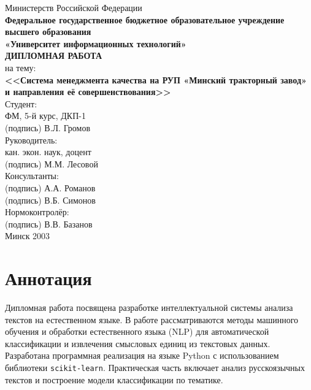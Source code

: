 \documentclass[14pt,a4paper]{extarticle}
\begin{document}
\begin{titlepage}
    \centering
    \large
    Министерств Российской Федерации\\
    \textbf{Федеральное государственное бюджетное образовательное учреждение высшего образования}\\
    \textbf{«Университет информационных технологий»}\\[2cm]

    \textbf{\Large ДИПЛОМНАЯ РАБОТА}\\[0.5cm]
    на тему:\\[0.3cm]
    \textbf{<<Система менеджмента качества на РУП «Минский тракторный завод» и направления её совершенствования>>}\\[4cm]

    Студент:\\
    ФМ, 5-й курс, ДКП-1\\
    (подпись) В.Л. Громов\\[1cm]

    Руководитель:\\
    кан. экон. наук, доцент\\
    (подпись) М.М. Лесовой\\[1cm]

    Консультанты:\\
    (подпись) А.А. Романов\\
    (подпись) В.Б. Симонов\\[1cm]

    Нормоконтролёр:\\
    (подпись) В.В. Базанов\\[3cm]

    Минск 2003
\end{titlepage}

\tableofcontents
\newpage

\section*{Аннотация}
Дипломная работа посвящена разработке интеллектуальной системы анализа текстов на естественном языке.
В работе рассматриваются методы машинного обучения и обработки естественного языка (NLP) для автоматической классификации и извлечения смысловых единиц из текстовых данных.
Разработана программная реализация на языке Python с использованием библиотеки \texttt{scikit-learn}.
Практическая часть включает анализ русскоязычных текстов и построение модели классификации по тематике.
\end{document}
